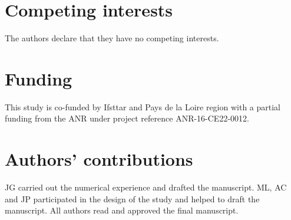 \documentclass[twocolumn]{svjour3}          %
\begin{document}
\section*{Competing interests}
The authors declare that they have no competing interests.

\section*{Funding}
This study is co-funded by Ifsttar and Pays de la Loire region with a partial funding from the ANR under project reference ANR-16-CE22-0012.

\section*{Authors' contributions}
JG carried out the numerical experience and drafted the manuscript. ML, AC and JP participated in the design of the study and helped to draft the manuscript.
All authors read and approved the final manuscript.


\end{document}
